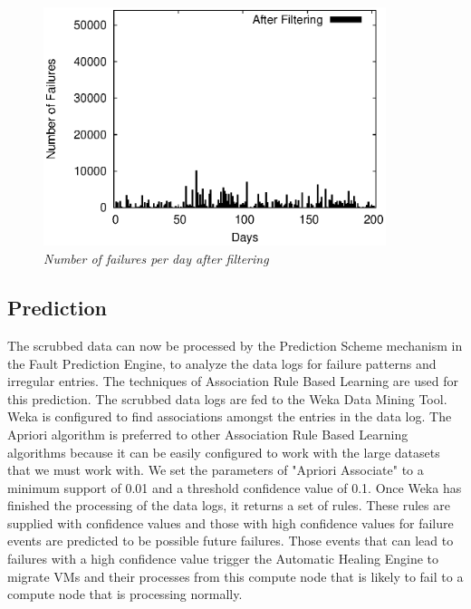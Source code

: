 	\begin{figure}[b]
		\begin{center}
			\includegraphics[width=10cm,height=7cm]{figures/histogram_filtered.eps} 
			\caption{\small \sl Number of failures per day after filtering\label{fig:Label7}} 
		\end{center} 
	\end{figure}


\subsection{Prediction}
The scrubbed data can now be processed by the Prediction Scheme mechanism in the Fault Prediction Engine, to analyze the data logs for failure patterns and irregular entries. The techniques of Association Rule Based Learning are used for this prediction. The scrubbed data logs are fed to the Weka Data Mining Tool.\cite{WEKA} Weka is configured to find associations amongst the entries in the data log. The Apriori algorithm is preferred to other Association Rule Based Learning algorithms because it can be easily configured to work with the large datasets that we must work with.\cite{APRIORI_1}\cite{APRIORI_2} We set the parameters of "Apriori Associate" to a minimum support of 0.01 and a threshold confidence value of 0.1. Once Weka has finished the processing of the data logs, it returns a set of rules. These rules are supplied with confidence values and those with high confidence values for failure events are predicted to be possible future failures. Those events that can lead to failures with a high confidence value trigger the Automatic Healing Engine to migrate VMs and their processes from this compute node that is likely to fail to a compute node that is processing normally.

